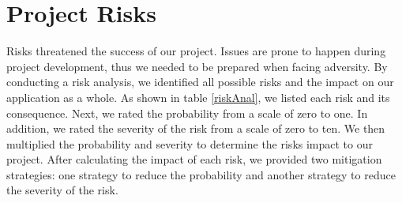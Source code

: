 \section{Project Risks}
Risks threatened the success of our project. Issues are prone to happen during project development, thus we needed to be prepared when facing adversity. By conducting a risk analysis\cite{swbook}, we identified all possible risks and the impact on our application as a whole. As shown in table \ref{riskAnal}, we listed each risk and its consequence. Next, we rated the probability from a scale of zero to one. In addition, we rated the severity of the risk from a scale of zero to ten. We then multiplied the probability and severity to determine the risk\textsc{}s impact to our project. After calculating the impact of each risk, we provided two mitigation strategies: one strategy to reduce the probability and another strategy to reduce the severity of the risk.
\FloatBarrier
